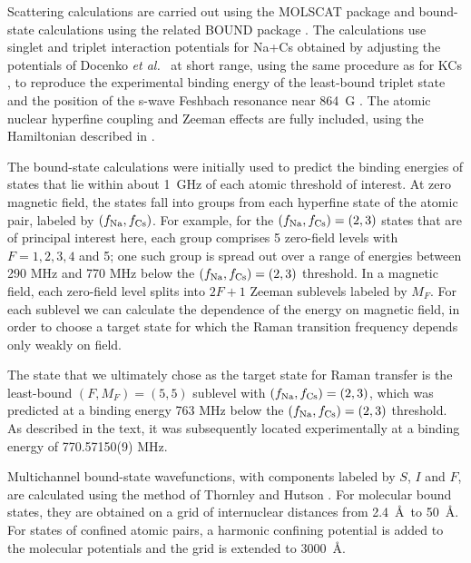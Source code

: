 \documentclass[aps,secnumarabic,amsmath,amssymb,10pt,superscriptaddress]{revtex4}
\begin{document}
Scattering calculations are carried out using the MOLSCAT package \cite{molscat:2019,
  mbf-github:2020} and bound-state calculations using the related BOUND package
\cite{bound+field:2019, mbf-github:2020}. The calculations use singlet and triplet interaction
potentials for Na+Cs obtained by adjusting the potentials of Docenko \emph{et al.}\
\cite{Docenko2006} at short range, using the same procedure as for KCs \cite{Groebner2017},
to reproduce the experimental binding energy of the least-bound triplet state \cite{Hood2019}
and the position of the s-wave Feshbach resonance near 864~G \cite{Zhang2020}. The atomic
nuclear hyperfine coupling and Zeeman effects are fully included, using the Hamiltonian described
in \cite{Hutson2008}.

The bound-state calculations were initially used to predict the binding energies of states that lie
within about 1~GHz of each atomic threshold of interest. At zero magnetic field, the states fall
into groups from each hyperfine state of the atomic pair, labeled by $(f_{\rm Na},f_{\rm Cs})$. For
example, for the $(f_{\rm Na},f_{\rm Cs}) = (2,3)$ states that are of principal interest here, each
group comprises 5 zero-field levels with $F=1,2,3,4$ and 5; one such group is spread out over a
range of energies between 290 MHz and 770 MHz below the $(f_{\rm Na},f_{\rm Cs}) = (2,3)$
threshold. In a magnetic field, each zero-field level splits into $2F+1$ Zeeman sublevels labeled
by $M_F$. For each sublevel we can calculate the dependence of the energy on magnetic field, in
order to choose a target state for which the Raman transition frequency depends only weakly on
field.

The state that we ultimately chose as the target state for Raman transfer is the least-bound
$(F,M_F)=(5,5)$ sublevel with $(f_{\rm Na},f_{\rm Cs}) = (2,3)$, which was predicted at a binding
energy 763 MHz below the $(f_{\rm Na},f_{\rm Cs}) = (2,3)$ threshold. As described in the text, it
was subsequently located experimentally at a binding energy of 770.57150(9) MHz.

Multichannel bound-state wavefunctions, with components labeled by $S$, $I$ and $F$, are calculated
using the method of Thornley and Hutson \cite{Thornley1994}. For molecular bound states, they are
obtained on a grid of internuclear distances from 2.4~\AA\ to 50~\AA. For states of confined atomic
pairs, a harmonic confining potential is added to the molecular potentials and the grid is extended
to 3000~\AA.
\end{document}
